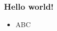 \documentclass{beamer}
\begin{document}
    \begin{frame}
        \frametitle{Hello world!}
        \begin{itemize}
            \item ABC
        \end{itemize}
    \end{frame}
\end{document}
